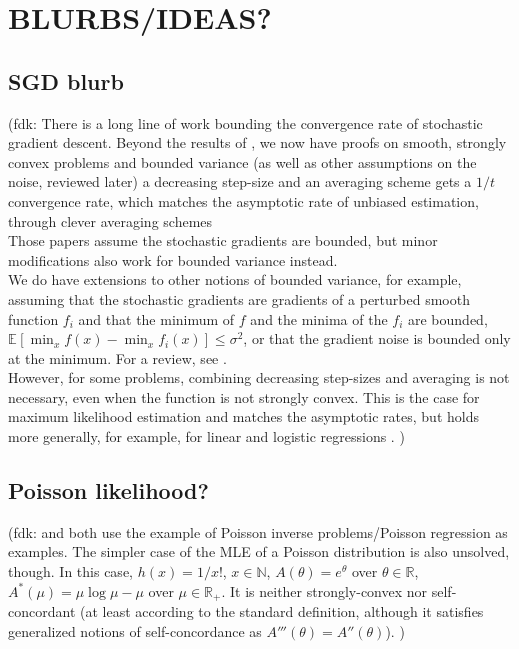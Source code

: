 \documentclass[twoside]{article}
\let\oldsection\section
\renewcommand{\section}[1]{\oldsection{\texorpdfstring{\uppercase{#1}}{#1}}}
\newcommand{\fdk}[1]{\textcolor{Periwinkle}{(fdk:#1)}}
\newcommand*{\expect}[2][]{\ensuremath{\mathbb{E}_{#1} \left[ #2 \right] }} %
\newcommand{\m}{\mu}
\begin{document}
\section{Blurbs/ideas?}



\subsection{SGD blurb}
\fdk{
%
There is a long line of work bounding the convergence rate of stochastic gradient descent.
Beyond the results of \citet{robbins1951stochastic},
we now have proofs on smooth, strongly convex problems and bounded variance
(as well as other assumptions on the noise, reviewed later)
a decreasing step-size and an averaging scheme gets
a $1/t$ convergence rate,
which matches the asymptotic rate of unbiased estimation,
through clever averaging schemes \citep{rakhlin2012making,lacostejulien2012simpler}
\\
Those papers assume the stochastic gradients are bounded,
but minor modifications also work for bounded variance instead.
\\
We do have extensions to other notions of bounded variance,
for example, assuming that the stochastic gradients are gradients of a perturbed smooth function $f_i$
and that the minimum of $f$ and the minima of the $f_i$
are bounded, $\expect{\min_x f(x) - \min_x f_i(x)} \leq \sigma^2$,
or that the gradient noise is bounded only at the minimum.
For a review, see \citet{gower2019sgd}.
\\
However, for some problems, combining decreasing step-sizes and averaging is not necessary,
even when the function is not strongly convex.
This is the case for maximum likelihood estimation and matches the asymptotic rates,
but holds more generally, for example, for linear and logistic regressions \citep{bach2013nonstronglyconvex,moulines2011non}.
}


\subsection{Poisson likelihood?}
\fdk{
\citet{bauschke2017descent} and \citet{hanzely2018fastest} both use the example of Poisson inverse problems/Poisson regression
as examples.
The simpler case of the MLE of a Poisson distribution is also unsolved, though.
In this case, $h(x) = 1/x!$, $x \in \mathbb{N}$, $A(\theta) = e^\theta$ over $\theta \in \mathbb{R}$,
$A^*(\m) = \m \log \m - \m$ over $\m \in \mathbb{R}_+$.
It is neither strongly-convex nor self-concordant (at least according to the standard definition,
although it satisfies generalized notions of self-concordance as $A'''(\theta) = A''(\theta)$).
}
\end{document}
